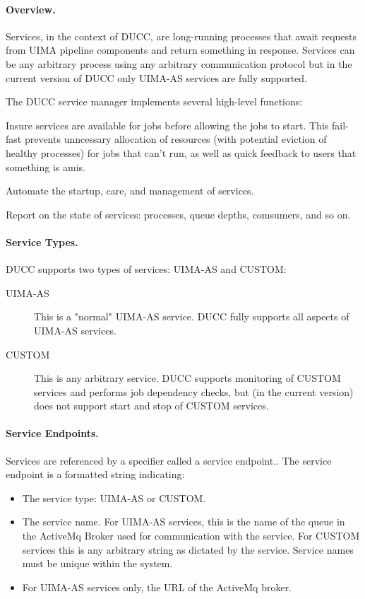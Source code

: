       \paragraph{Overview.} 
      Services, in the context of DUCC, are long-running processes that await requests from
      UIMA pipeline components and return something in response. Services can be any arbitrary process
      using any arbitrary communication protocol but in the current version of DUCC only UIMA-AS
      services are fully supported.

      The DUCC service manager implements several high-level functions:
      
      Insure services are available for jobs before allowing the jobs to start. This fail-fast
      prevents unncessary allocation of resources (with potential eviction of healthy processes) for
      jobs that can't run, as well as quick feedback to users that something is amis.
      
      Automate the startup, care, and management of services.
      
      Report on the state of services: processes, queue depths, comsumers, and so on.  

      \paragraph{Service Types.}
      DUCC supports two types of services: UIMA-AS and CUSTOM:
      
      \begin{description}
          \item[UIMA-AS] This is a "normal" UIMA-AS service. DUCC fully supports all aspects of UIMA-AS
            services.
            
          \item[CUSTOM] This is any arbitrary service. DUCC supports monitoring of CUSTOM services
            and performs job dependency checks, but (in the current version) does not support start
            and stop of CUSTOM services.
      \end{description}

      \paragraph{Service Endpoints.} Services are referenced by a specifier called a service
      endpoint.. The service endpoint is a formatted string indicating:

      \begin{itemize}
         \item The service type: UIMA-AS or CUSTOM.

         \item The service name. For UIMA-AS services, this is the name of the queue in the ActiveMq
           Broker used for communication with the service. For CUSTOM services this is any arbitrary
           string as dictated by the service. Service names must be unique within the system.

         \item For UIMA-AS services only, the URL of the ActiveMq broker.  
      \end{itemize}

